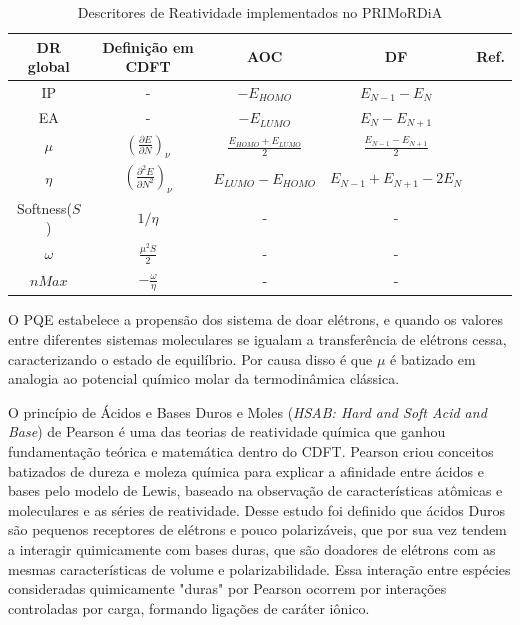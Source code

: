 \documentclass[a4paper,11pt]{refart}
\begin{document}
\hspace*{-\leftmarginwidth}
\begin{minipage}{\fullwidth}
	\begin{table}[H]
		\centering	
		\caption{Descritores de Reatividade implementados no PRIMoRDiA}
		\begin{tabular}{c|c|c|c|c}
			\toprule
			DR global & Definição em CDFT  & AOC & DF & Ref. \\
			\midrule
			IP & -  & $- E_{HOMO}$ & $E_{N-1}-E_{N}$  &  \\  \hline	
			EA & -  & $- E_{LUMO}$ & $E_{N}-E_{N+1}$ & \\ \hline	
			$\mu$  & $\left(\frac{\partial E}{\partial N} \right)_\nu$  & $\frac{E_{HOMO} + E_{LUMO}}{2}$ &$\frac{E_{N-1}-E_{N+1}}{2}$ & \cite{ribeiro2017atlas}\\ \hline			
			$\eta$  & $\left(\frac{\partial ^2  E}{\partial N ^2} \right)_\nu$ &$E_{LUMO} - E_{HOMO}$ &$E_{N-1}+E_{N+1}-2E_{N}$ & \cite{parr1983absolute}\\ \hline
			Softness($S$)  & $1/\eta$  & - & -  & \cite{parr1983absolute} \\ \hline
			$\omega$  & $\frac{\mu^2S}{2}$  &-  &-  & \cite{cedillo2012local} \\ \hline
			$nMax$  & $-\frac{\omega}{\eta} $ & - & - & \cite{cedillo2012local}  \\ 
			\bottomrule
		\end{tabular} 
		\label{tab1}	
	\end{table}	
\end{minipage}


O PQE estabelece a propensão dos sistema de doar elétrons, e quando os valores entre diferentes sistemas moleculares se igualam a transferência de elétrons cessa, caracterizando o estado de equilíbrio\cite{parr1983absolute}. Por causa disso é que $\mu$ é batizado em analogia ao potencial químico molar da termodinâmica clássica. 

O princípio de Ácidos e Bases Duros e Moles  (\textit{HSAB: Hard and Soft Acid and Base}) de Pearson\cite{pearson1987recent} é uma das teorias de reatividade química que ganhou fundamentação teórica e matemática dentro do CDFT. Pearson criou conceitos batizados de dureza e moleza química para explicar a afinidade entre ácidos e bases pelo modelo de Lewis, baseado na observação de características atômicas e moleculares e as séries de reatividade\cite{Pearson1963}. Desse estudo foi definido que ácidos Duros são pequenos receptores de elétrons e pouco polarizáveis, que por sua vez tendem a interagir quimicamente com bases duras, que são doadores de elétrons com as mesmas características de volume e polarizabilidade. Essa interação entre espécies consideradas quimicamente "duras" por Pearson ocorrem por interações controladas por carga, formando ligações de caráter iônico. 
\end{document}
